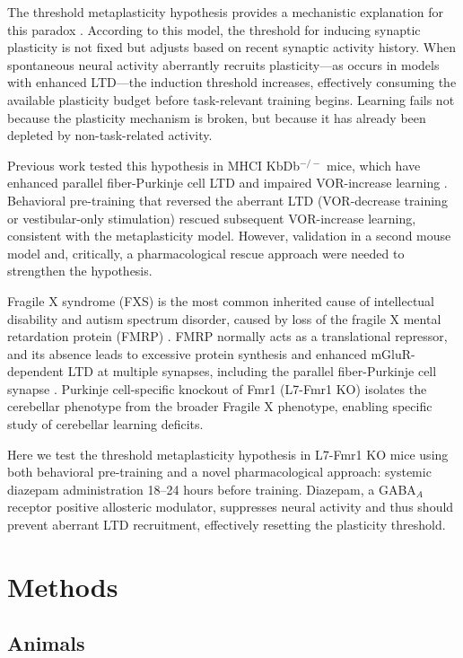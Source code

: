 \documentclass[11pt]{article}
\begin{document}
The threshold metaplasticity hypothesis provides a mechanistic explanation for this paradox \citep{bienenstock1982,abraham2008}. According to this model, the threshold for inducing synaptic plasticity is not fixed but adjusts based on recent synaptic activity history. When spontaneous neural activity aberrantly recruits plasticity---as occurs in models with enhanced LTD---the induction threshold increases, effectively consuming the available plasticity budget before task-relevant training begins. Learning fails not because the plasticity mechanism is broken, but because it has already been depleted by non-task-related activity.

Previous work tested this hypothesis in MHCI KbDb$^{-/-}$ mice, which have enhanced parallel fiber-Purkinje cell LTD and impaired VOR-increase learning \citep{mcconnell2009}. Behavioral pre-training that reversed the aberrant LTD (VOR-decrease training or vestibular-only stimulation) rescued subsequent VOR-increase learning, consistent with the metaplasticity model. However, validation in a second mouse model and, critically, a pharmacological rescue approach were needed to strengthen the hypothesis.

Fragile X syndrome (FXS) is the most common inherited cause of intellectual disability and autism spectrum disorder, caused by loss of the fragile X mental retardation protein (FMRP) \citep{hagerman2017}. FMRP normally acts as a translational repressor, and its absence leads to excessive protein synthesis and enhanced mGluR-dependent LTD at multiple synapses, including the parallel fiber-Purkinje cell synapse \citep{huber2002,koekkoek2005}. Purkinje cell-specific knockout of Fmr1 (L7-Fmr1 KO) isolates the cerebellar phenotype from the broader Fragile X phenotype, enabling specific study of cerebellar learning deficits.

Here we test the threshold metaplasticity hypothesis in L7-Fmr1 KO mice using both behavioral pre-training and a novel pharmacological approach: systemic diazepam administration 18--24 hours before training. Diazepam, a GABA$_A$ receptor positive allosteric modulator, suppresses neural activity and thus should prevent aberrant LTD recruitment, effectively resetting the plasticity threshold.

\section{Methods}

\subsection{Animals}
\end{document}
